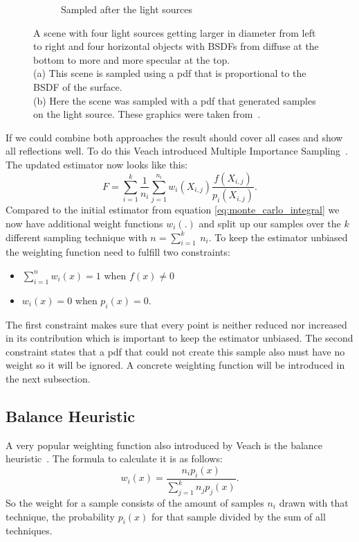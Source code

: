 \begin{figure}
\begin{subfigure}[b]{0.45\textwidth}
        \caption{Sampled after the light sources}
        \label{fig:veach_mis_light}
    \end{subfigure}
    \caption{A scene with four light sources getting larger in diameter from left to right
    and four horizontal objects with BSDFs from diffuse at the bottom to more and more specular at the top.\\
    (a) This scene is sampled using a pdf that is proportional to the BSDF of the surface.\\
    (b) Here the scene was sampled with a pdf that generated samples on the light source.
    These graphics were taken from~\cite[Figure~9.2]{veach-thesis}.}
    \label{fig:veach_mis_single}
\end{figure}

If we could combine both approaches the result should cover all cases and show all reflections well.
To do this Veach introduced Multiple Importance Sampling~\cite[Chapter~9]{veach-thesis}.
The updated estimator now looks like this:
\begin{equation}
    \label{eq:mis_estimator}
    F = \sum_{i = 1}^k \frac{1}{n_i} \sum_{j = 1}^{n_i} w_i(X_{i,j}) \frac{f(X_{i,j})}{p_i(X_{i,j})}.
\end{equation}
Compared to the initial estimator from equation \ref{eq:monte_carlo_integral} we now have additional weight functions $ w_i(.) $
and split up our samples over the $ k $ different sampling technique with $ n = \sum_{i = 1}^k~n_i $.
To keep the estimator unbiased the weighting function need to fulfill two constraints:
\begin{itemize}
    \item $ \sum_{i = 1}^n w_i(x) = 1 $ when $ f(x) \neq 0 $
    \item $ w_i(x) = 0 $ when $ p_i(x) = 0 $.
\end{itemize}
The first constraint makes sure that every point is neither reduced nor increased in its contribution
which is important to keep the estimator unbiased.
The second constraint states that a pdf that could not create this sample also must have no weight
so it will be ignored.
A concrete weighting function will be introduced in the next subsection.


\subsection{Balance Heuristic}
\label{sec:balance_heuristic}
A very popular weighting function also introduced by Veach is the balance heuristic~\cite[Chapter~9.2.2]{veach-thesis}.
The formula to calculate it is as follows:
\begin{equation}
    \label{eq:balance_weighting}
    w_i(x) = \frac{n_i p_i(x)}{\sum_{j = 1}^k n_j p_j(x)}.
\end{equation}
So the weight for a sample consists of the amount of samples $ n_i $ drawn with that technique,
the probability $ p_i(x) $ for that sample divided by the sum of all techniques.

